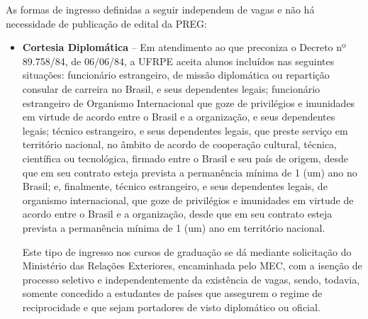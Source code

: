 \documentclass[
	12pt,				%
	openright,			%
  oneside,     %
	a4paper,			%
	chapter=TITLE,		%
	english,			%
	french,				%
	spanish,			%
	brazil				%
	]{abntex2}
\begin{document}
As formas de ingresso definidas a seguir independem de vagas e não há necessidade de publicação de edital da PREG:

\begin{itemize}
    \item \textbf{Cortesia Diplomática} – Em atendimento ao que preconiza o Decreto nº 89.758/84, de 06/06/84, a UFRPE aceita alunos incluídos nas seguintes situações: funcionário estrangeiro, de missão diplomática ou repartição consular de carreira no Brasil, e seus dependentes legais; funcionário estrangeiro de Organismo Internacional que goze de privilégios e imunidades em virtude de acordo entre o Brasil e a organização, e seus dependentes legais; técnico estrangeiro, e seus dependentes legais, que preste serviço em território nacional, no âmbito de acordo de cooperação cultural, técnica, científica ou tecnológica, firmado entre o Brasil e seu país de origem, desde que em seu contrato esteja prevista a permanência mínima de 1 (um) ano no Brasil; e, finalmente, técnico estrangeiro, e seus dependentes legais, de organismo internacional, que goze de privilégios e imunidades em virtude de acordo entre o Brasil e a organização, desde que em seu contrato esteja prevista a permanência mínima de 1 (um) ano em território nacional.

    Este tipo de ingresso nos cursos de graduação se dá mediante solicitação do Ministério das Relações Exteriores, encaminhada pelo MEC, com a isenção de processo seletivo e independentemente da existência de vagas, sendo, todavia, somente concedido a estudantes de países que assegurem o regime de reciprocidade e que sejam portadores de visto diplomático ou oficial.


\end{itemize}
\end{document}
